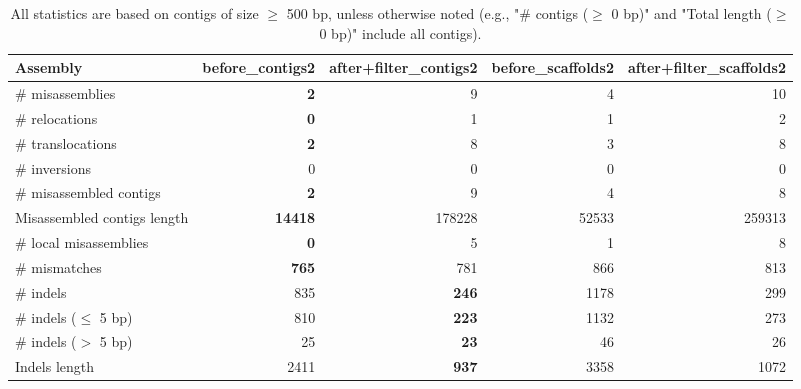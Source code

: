\documentclass[12pt,a4paper]{article}
\begin{document}
\begin{table}[ht]
\begin{center}
\caption{All statistics are based on contigs of size $\geq$ 500 bp, unless otherwise noted (e.g., "\# contigs ($\geq$ 0 bp)" and "Total length ($\geq$ 0 bp)" include all contigs).}
\begin{tabular}{|l*{4}{|r}|}
\hline
Assembly & before\_contigs2 & after+filter\_contigs2 & before\_scaffolds2 & after+filter\_scaffolds2 \\ \hline
\# misassemblies & {\bf 2} & 9 & 4 & 10 \\ \hline
\hspace{5mm}\# relocations & {\bf 0} & 1 & 1 & 2 \\ \hline
\hspace{5mm}\# translocations & {\bf 2} & 8 & 3 & 8 \\ \hline
\hspace{5mm}\# inversions & 0 & 0 & 0 & 0 \\ \hline
\# misassembled contigs & {\bf 2} & 9 & 4 & 8 \\ \hline
Misassembled contigs length & {\bf 14418} & 178228 & 52533 & 259313 \\ \hline
\# local misassemblies & {\bf 0} & 5 & 1 & 8 \\ \hline
\# mismatches & {\bf 765} & 781 & 866 & 813 \\ \hline
\# indels & 835 & {\bf 246} & 1178 & 299 \\ \hline
\hspace{5mm}\# indels ($\leq$ 5 bp) & 810 & {\bf 223} & 1132 & 273 \\ \hline
\hspace{5mm}\# indels ($>$ 5 bp) & 25 & {\bf 23} & 46 & 26 \\ \hline
Indels length & 2411 & {\bf 937} & 3358 & 1072 \\ \hline
\end{tabular}
\end{center}
\end{table}
\end{document}
